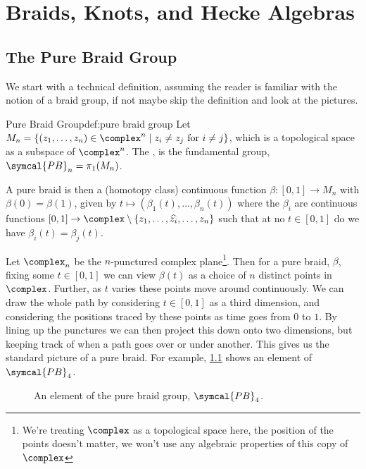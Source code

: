 \documentclass[fleqn]{NotesClass}
\newcommand{\purebraid}{\symcal{PB}}
\begin{document}
    
    \chapter{Braids, Knots, and Hecke Algebras}
    \section{The Pure Braid Group}
    We start with a technical definition, assuming the reader is familiar with the notion of a braid group, if not maybe skip the definition and look at the pictures.
    
    \begin{dfn}{Pure Braid Group}{def:pure braid group}
        Let \(M_n = \{(z_1, \dotsc, z_n) \in \complex^n \mid z_i \ne z_j \text{ for } i \ne j\}\), which is a topological space as a subspace of \(\complex^n\).
        The , is the fundamental group, \(\purebraid_n = \pi_1(M_n)\).
    \end{dfn}
    
    A pure braid is then a (homotopy class) continuous function \(\beta \colon [0, 1] \to M_n\) with \(\beta(0) = \beta(1)\), given by \(t \mapsto (\beta_1(t), \dotsc, \beta_n(t))\) where the \(\beta_i\) are continuous functions \([0, 1] \to \complex \setminus \{z_1, \dotsc, \widehat{z_i}, \dotsc, z_n\}\) such that at no \(t \in [0, 1]\) do we have \(\beta_i(t) = \beta_j(t)\).
    
    Let \(\complex_n\) be the \(n\)-punctured complex plane\footnote{We're treating \(\complex\) as a topological space here, the position of the points doesn't matter, we won't use any algebraic properties of this copy of \(\complex\)}.
    Then for a pure braid, \(\beta\), fixing some \(t \in [0, 1]\) we can view \(\beta(t)\) as a choice of \(n\) distinct points in \(\complex\).
    Further, as \(t\) varies these points move around continuously.
    We can draw the whole path by considering \(t \in [0, 1]\) as a third dimension, and considering the positions traced by these points as time goes from \(0\) to \(1\).
    By lining up the punctures we can then project this down onto two dimensions, but keeping track of when a path goes over or under another.
    This gives us the standard picture of a pure braid.
    For example, \cref{fig:pure braid example} shows an element of \(\purebraid_4\).
    
    \begin{figure}
        \centering
        \caption[An element of the pure braid group]{An element of the pure braid group, \(\purebraid_4\).}
        \label{fig:pure braid example}
    \end{figure}
    
\end{document}
